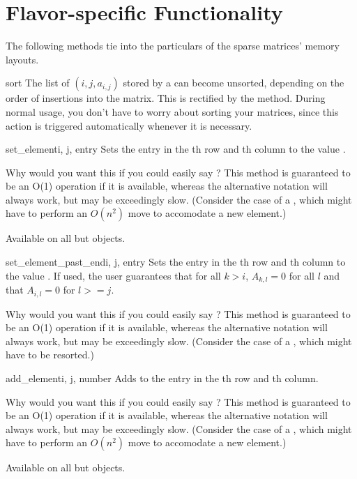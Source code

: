 \section{Flavor-specific Functionality}

The following methods tie into the particulars of the sparse matrices'
memory layouts.

\begin{methoddesc}[SparseBuildMatrix]{sort}{}
  The list of $(i,j,a_{i,j})$ stored by a 
  can become unsorted, depending on the order of insertions into the
  matrix.  This is rectified by the  method. During
  normal usage, you don't have to worry about sorting your matrices,
  since this action is triggered automatically whenever it is
  necessary.
\end{methoddesc}
\begin{methoddesc}{set_element}{i, j, entry}
  Sets the entry in the th row and th column to the
  value .

  Why would you want this if you could easily say ? This method is guaranteed to be an O(1) operation if it is
  available, whereas the alternative notation will always work, but
  may be exceedingly slow. (Consider the case of a
  , which might have to perform an $O(n^2)$
  move to accomodate a new element.)

  Available on all but  objects.
\end{methoddesc}
\begin{methoddesc}[Matrix]{set_element_past_end}{i, j, entry}
  Sets the entry in the th row and th column to the
  value . If used, the user guarantees that for all
  $k>i$, $A_{k,l}=0$ for all $l$ and that $A_{i,l}=0$ for $l>=j$.

  Why would you want this if you could easily say ? This method is guaranteed to be an O(1) operation if 
  it is available, whereas the alternative notation will always
  work, but may be exceedingly slow. (Consider the case of a
  , which might have to be resorted.)
\end{methoddesc}
\begin{methoddesc}[Matrix]{add_element}{i, j, number}
  Adds  to the entry in the th row and th
  column.

  Why would you want this if you could easily say ? This method is guaranteed to be an O(1) operation if it is
  available, whereas the alternative notation will always work, but
  may be exceedingly slow. (Consider the case of a
  , which might have to perform an $O(n^2)$
  move to accomodate a new element.)

  Available on all but  objects.
\end{methoddesc}
